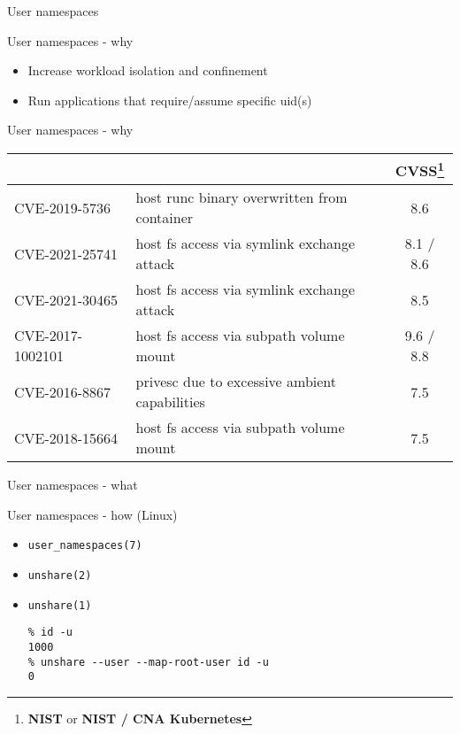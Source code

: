 \documentclass[ignorenonframetext,aspectratio=169,12pt]{beamer}
\def\svgwidth{4cm}
\begin{document}
\begin{frame}[plain]
\centering
\huge User namespaces
\end{frame}

\begin{frame}{User namespaces - why}
\protect\hypertarget{userns-why}{}
\begin{itemize}
\item Increase workload isolation and confinement
\item Run applications that require/assume specific uid(s)
\end{itemize}
\end{frame}

\begin{frame}{User namespaces - why}
\protect\hypertarget{userns-why-cves}{}
  \centering
  \small
  \def\arraystretch{1.5}
  \begin{tabular}{|l|p{}|c|}
      \centering {\bf CVE} & \centering {\bf description} & {\bf CVSS}\footnote{{\bf NIST} or {\bf NIST / CNA Kubernetes}} \\
    \hline
    CVE-2019-5736    & host runc binary overwritten from container & 8.6 \\
    CVE-2021-25741   & host fs access via symlink exchange attack & 8.1 / 8.6 \\
    CVE-2021-30465   & host fs access via symlink exchange attack & 8.5 \\
    CVE-2017-1002101 & host fs access via subpath volume mount & 9.6 / 8.8 \\
    CVE-2016-8867    & privesc due to excessive ambient capabilities & 7.5 \\
    CVE-2018-15664   & host fs access via subpath volume mount & 7.5 \\
  \end{tabular}
\end{frame}

\begin{frame}{User namespaces - what}
\protect\hypertarget{userns-what}{}
\begin{center}
\def\svgwidth{\textwidth}

\end{center}
\end{frame}

\begin{frame}[fragile]{User namespaces - how (Linux)}
\protect\hypertarget{userns-how-linux}{}
\begin{itemize}
    \item {\tt user\_namespaces(7)}
    \item {\tt unshare(2)}
    \item {\tt unshare(1)}
\begin{lstlisting}
% id -u
1000
% unshare --user --map-root-user id -u
0
\end{lstlisting}
\end{itemize}
\end{frame}
\end{document}
